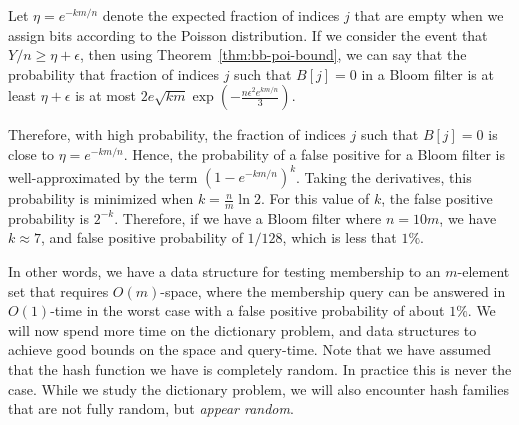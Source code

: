 Let $\eta = e^{-km/n}$ denote the expected fraction of indices $j$ that are
empty when we assign bits according to the Poisson distribution. If we consider
the event that $Y/n \geq \eta + \epsilon$, then using
Theorem~\ref{thm:bb-poi-bound}, we can say that the probability that fraction of
indices $j$ such that $B[j] = 0$ in a Bloom filter is at least $\eta + \epsilon$
is at most $2e\sqrt{km}\exp\left(-\frac{n\epsilon^2e^{km/n}}{3} \right)$.

Therefore, with high probability, the fraction of indices $j$ such that
$B[j] = 0$ is close to $\eta = e^{-km/n}$. Hence, the probability of a false
positive for a Bloom filter is well-approximated by the term
$(1-e^{-km/n})^k$. Taking the derivatives, this probability is minimized when
$k = \tfrac{n}{m}\ln 2$. For this value of $k$, the false positive probability
is $2^{-k}$. Therefore, if we have a Bloom filter where $n = 10m$, we have
$k \approx 7$, and false positive probability of $1/128$, which is less that
$1\%$.

In other words, we have a data structure for testing membership to an
$m$-element set that requires $O(m)$-space, where the membership query can be
answered in $O(1)$-time in the worst case with a false positive probability of
about $1\%$. We will now spend more time on the dictionary problem, and data
structures to achieve good bounds on the space and query-time. Note that we have
assumed that the hash function we have is completely random. In practice this is
never the case. While we study the dictionary problem, we will also encounter
hash families that are not fully random, but \emph{appear random}.
